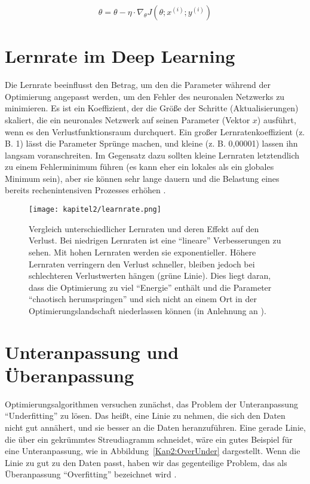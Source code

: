    \begin{equation} \label{FormelGradStoch}
      \theta = \theta - \eta \cdot \nabla_{\theta}J(\theta;x^{(i)};y^{(i)})
    \end{equation}



    \section{Lernrate im Deep Learning}
    Die Lernrate beeinflusst den Betrag, um den die Parameter während der Optimierung angepasst werden, um den Fehler des neuronalen Netzwerks zu minimieren. Es ist ein Koeffizient, der die Größe der Schritte (Aktualisierungen) skaliert, die ein neuronales Netzwerk auf seinen Parameter (Vektor $x$) ausführt, wenn es den Verlustfunktionsraum durchquert. Ein großer Lernratenkoeffizient (z. B. 1) lässt die Parameter Sprünge machen, und kleine (z. B. 0,00001) lassen ihn langsam voranschreiten. Im Gegensatz dazu sollten kleine Lernraten letztendlich zu einem Fehlerminimum führen (es kann eher ein lokales als ein globales Minimum sein), aber sie können sehr lange dauern und die Belastung eines bereits rechenintensiven Prozesses erhöhen  \cite*[77]{Patterson2019}.


    \begin{figure}[H]
      \centering
      \texttt{[image: kapitel2/learnrate.png]}
      \caption[Einfluss der Lernrate auf den Verlust]{Vergleich unterschiedlicher Lernraten und deren Effekt auf den Verlust. Bei niedrigen Lernraten ist eine \enquote{lineare} Verbesserungen zu sehen. Mit hohen Lernraten werden sie exponentieller. Höhere Lernraten verringern den Verlust schneller, bleiben jedoch bei schlechteren Verlustwerten hängen (grüne Linie). Dies liegt daran, dass die Optimierung zu viel \enquote{Energie} enthält und die Parameter \enquote{chaotisch herumspringen} und sich nicht an einem Ort in der Optimierungslandschaft niederlassen können (in Anlehnung an \cite*{StanfordUniversityCoursecs231n2018}). }
      \label{Kap2:Lern}
    \end{figure}

    \section{Unteranpassung und Überanpassung}
    Optimierungsalgorithmen versuchen zunächst, das Problem der Unteranpassung \enquote{Underfitting} zu lösen. Das heißt, eine Linie zu nehmen, die sich den Daten nicht gut annähert, und sie besser an die Daten heranzuführen. Eine gerade Linie, die über ein gekrümmtes Streudiagramm schneidet, wäre ein gutes Beispiel für eine Unteranpassung, wie in Abbildung~\ref{Kap2:OverUnder} dargestellt. Wenn die Linie zu gut zu den Daten passt, haben wir das gegenteilige Problem, das als Überanpassung \enquote{Overfitting} bezeichnet wird \cite*[27]{Patterson2019}.

